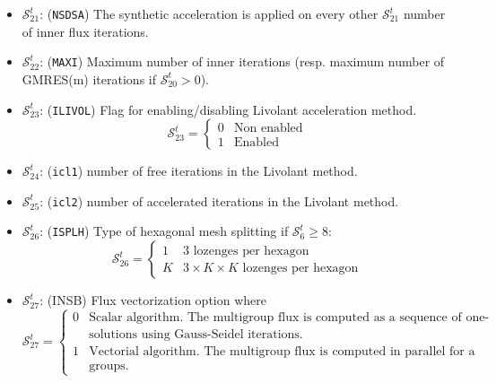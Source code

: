 \begin{itemize}
\item $\mathcal{S}^{t}_{21}$: ({\tt NSDSA}) The synthetic acceleration is applied on every other $\mathcal{S}^{t}_{21}$ number of inner flux iterations.

\item $\mathcal{S}^{t}_{22}$: ({\tt MAXI}) Maximum number of inner iterations (resp. maximum number of GMRES(m) iterations if $\mathcal{S}^{t}_{20}>0$).

\item $\mathcal{S}^{t}_{23}$: ({\tt ILIVOL}) Flag for enabling/disabling Livolant acceleration method.
\begin{displaymath}
\mathcal{S}^{t}_{23} = \left\{
\begin{array}{rl}
 0 & \textrm{Non enabled} \\
 1 & \textrm{Enabled}
\end{array} \right.
\end{displaymath}

\item $\mathcal{S}^{t}_{24}$: ({\tt icl1}) number of free iterations in the Livolant method.
\item $\mathcal{S}^{t}_{25}$: ({\tt icl2}) number of accelerated iterations in the Livolant method.
\item $\mathcal{S}^{t}_{26}$: ({\tt ISPLH}) Type of hexagonal mesh splitting if $\mathcal{S}^{t}_{6}\ge 8$:
\begin{displaymath}
\mathcal{S}^{t}_{26} = \left\{
\begin{array}{rl}
 1 & \textrm{$3$ lozenges per hexagon} \\
 K & \textrm{$3\times K \times K$ lozenges per hexagon}
\end{array} \right.
\end{displaymath}

\item $\mathcal{S}^{t}_{27}$: (INSB) Flux vectorization option where
\begin{displaymath}
\mathcal{S}^{t}_{27} = \left\{
\begin{array}{rl}
 0 & \textrm{Scalar algorithm. The multigroup flux is computed as a sequence of one-group}\\
 & \textrm{solutions using Gauss-Seidel iterations.} \\
 1 & \textrm{Vectorial algorithm. The multigroup flux is computed in parallel for a set of energy}\\
 & \textrm{groups.}
\end{array} \right.
\end{displaymath}


\end{itemize}
